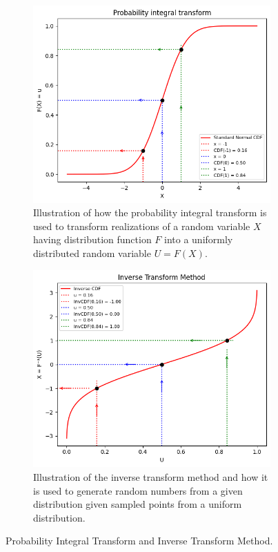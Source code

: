 \begin{figure}[h]
    \centering
    \begin{subfigure}[t]{0.45\linewidth}
        \centering
        \includegraphics[width=\linewidth]{3Theory/pictures/ProbabilityIntegralTransform.png}
        \caption{Illustration of how the probability integral transform is used to transform realizations of a random variable $X$ having distribution function $F$ into a uniformly distributed random variable $U = F(X)$.}
        \label{fig:PIT}
    \end{subfigure}
    \hfill
    \begin{subfigure}[t]{0.45\linewidth}
        \centering
        \includegraphics[width=\linewidth]{3Theory/pictures/InverseTransformMethod.png}
        \caption{Illustration of the inverse transform method and how it is used to generate random numbers from a given distribution given sampled points from a uniform distribution.}
        \label{fig:ITM}
    \end{subfigure}
    \caption{Probability Integral Transform and Inverse Transform Method.}
    \label{fig:TransformMethods}
\end{figure}





